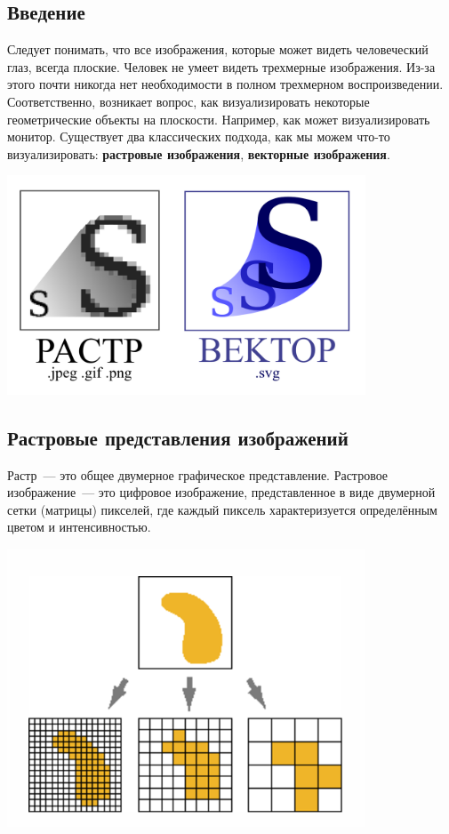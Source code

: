 
\subsection{Введение}
Следует понимать, что все изображения, которые может видеть человеческий глаз, всегда плоские. Человек не умеет видеть трехмерные изображения. Из-за этого почти никогда нет необходимости в полном трехмерном воспроизведении. Соответственно, возникает вопрос, как визуализировать некоторые геометрические объекты на плоскости. Например, как может визуализировать монитор. Существует два классических подхода, как мы можем что-то визуализировать: \textbf{растровые изображения}, \textbf{векторные изображения}.
\begin{center}
    \includegraphics[width=0.8\textwidth]{r_v.PNG}

\end{center}

\subsection{Растровые представления изображений}
\label{base-section}
Растр~--- это общее двумерное графическое представление.
Растровое изображение~--- это цифровое изображение, представленное в виде двумерной сетки (матрицы) пикселей, где каждый пиксель характеризуется определённым цветом и интенсивностью.
\begin{center}
    \includegraphics[width=0.8\textwidth]{rastr.png}

\end{center}
